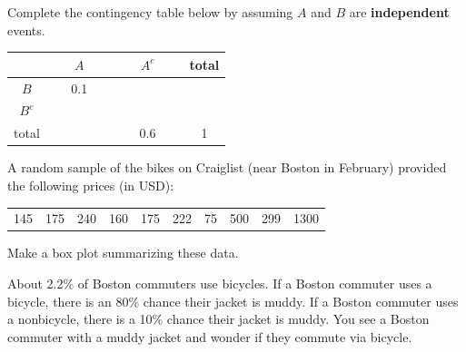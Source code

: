 \documentclass[12pt,letterpaper,addpoints]{exam}
\begin{document}
\begin{questions}

\newpage

\question[5] Complete the contingency table below by assuming $A$ and $B$ are {\bf independent} events.
\begin{center}\LARGE
\begin{tabular}{c|c c | c} 
     & ~~~$A$~~~ & ~~~$A^c$~~~ & total\\ \hline
$B$  & 0.1 &       & \\
$B^c$&     &       & \\ \hline
total &    &  0.6  & 1
\end{tabular}
\end{center}

\vfill

\question[5] A random sample of the bikes on Craiglist (near Boston in February) provided the following prices (in USD):
\begin{center}
\begin{tabular}{cccccccccc}
145 & 175 & 240 & 160 & 175 & 222 & 75 & 500 & 299 & 1300
\end{tabular}
\end{center}
Make a box plot summarizing these data.

\vfill

\newpage

\question [10] About 2.2\% of Boston commuters use bicycles. If a Boston commuter uses a bicycle, there is an 80\% chance their jacket is muddy. If a Boston commuter uses a nonbicycle, there is a 10\% chance their jacket is muddy. You see a Boston commuter with a muddy jacket and wonder if they commute via bicycle.


\end{questions}
\end{document}
